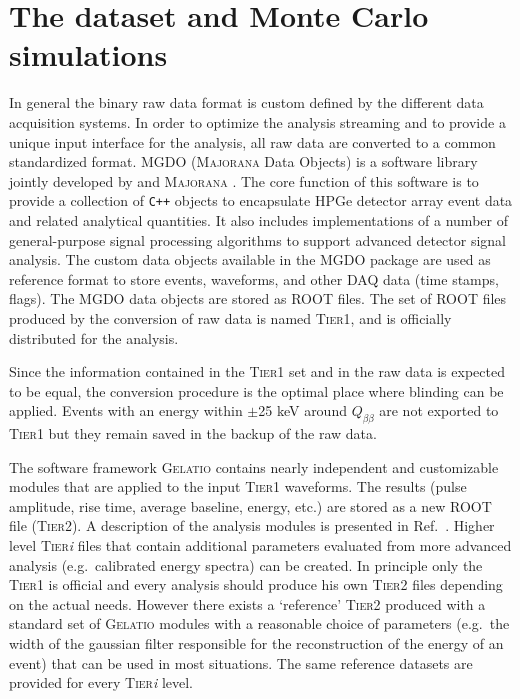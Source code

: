 \section{The {\gerda} dataset and Monte Carlo simulations}\label{sec:data}
 In general the binary raw data format is custom defined by the different data acquisition systems. In order to optimize the analysis streaming and to provide a unique input interface for the analysis, all raw data are converted to a common standardized format. MGDO \cite{MGDO} (\textsc{Majorana} {\gerda} Data Objects) is a software library jointly developed by {\gerda} and \textsc{Majorana} \cite{majoranadem}. The core function of this software is to provide a collection of \texttt{C++} objects to encapsulate HPGe detector array event data and related analytical quantities. It also includes implementations of a number of general-purpose signal processing algorithms to support advanced detector signal analysis. The custom data objects available in the MGDO package are used as reference format to store events, waveforms, and other DAQ data (time stamps, flags). The MGDO data objects are stored as ROOT \cite{ROOT} files. The set of ROOT files produced by the conversion of raw data is named \textsc{Tier1}, and is officially distributed for the analysis.

Since the information contained in the \textsc{Tier1} set and in the raw data is expected to be equal, the conversion procedure is the optimal place where blinding can be applied. Events with an energy within $\pm$25 keV around $Q_{\beta\beta}$ are not exported to \textsc{Tier1} but they remain saved in the backup of the raw data.

The software framework \textsc{Gelatio} \cite{GELATIO} contains nearly independent and customizable modules that are applied to the input \textsc{Tier1} waveforms. The results (pulse amplitude, rise time, average baseline, energy, etc.) are stored as a new ROOT file (\textsc{Tier2}). A description of the analysis modules is presented in Ref.~\cite{dataproc}. Higher level \textsc{Tier}\emph{i} files that contain additional parameters evaluated from more advanced analysis (e.g.~calibrated energy spectra) can be created. In principle only the \textsc{Tier1} is official and every analysis should produce his own \textsc{Tier2} files depending on the actual needs. However there exists a `reference' \textsc{Tier2} produced with a standard set of \textsc{Gelatio} modules with a reasonable choice of parameters (e.g.~the width of the gaussian filter responsible for the reconstruction of the energy of an event) that can be used in most situations. The same reference datasets are provided for every \textsc{Tier}\emph{i} level.

